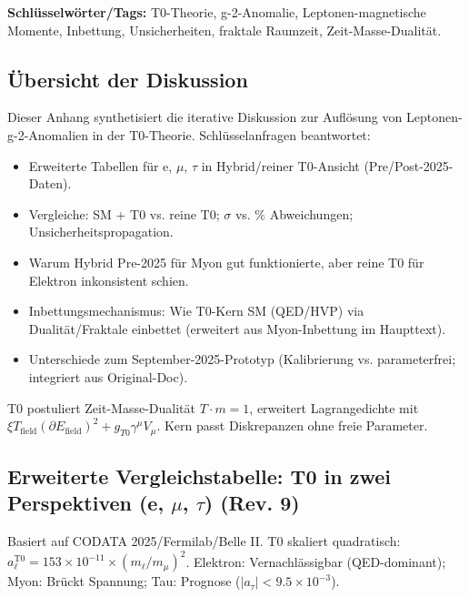 \documentclass[12pt,a4paper]{article}
\theoremstyle{definition}
\begin{document}
	\textbf{Schlüsselwörter/Tags:} T0-Theorie, g-2-Anomalie, Leptonen-magnetische Momente, Inbettung, Unsicherheiten, fraktale Raumzeit, Zeit-Masse-Dualität.
	
	\subsection{Übersicht der Diskussion}
	
	Dieser Anhang synthetisiert die iterative Diskussion zur Auflösung von Leptonen-g-2-Anomalien in der T0-Theorie. Schlüsselanfragen beantwortet:
	\begin{itemize}
		\item Erweiterte Tabellen für e, $\mu$, $\tau$ in Hybrid/reiner T0-Ansicht (Pre/Post-2025-Daten).
		\item Vergleiche: SM + T0 vs. reine T0; $\sigma$ vs. \% Abweichungen; Unsicherheitspropagation.
		\item Warum Hybrid Pre-2025 für Myon gut funktionierte, aber reine T0 für Elektron inkonsistent schien.
		\item Inbettungsmechanismus: Wie T0-Kern SM (QED/HVP) via Dualität/Fraktale einbettet (erweitert aus Myon-Inbettung im Haupttext).
		\item Unterschiede zum September-2025-Prototyp (Kalibrierung vs. parameterfrei; integriert aus Original-Doc).
	\end{itemize}
	
	T0 postuliert Zeit-Masse-Dualität $T \cdot m = 1$, erweitert Lagrangedichte mit $\xi T_\text{field} (\partial E_\text{field})^2 + g_{T0} \gamma^\mu V_\mu$. Kern passt Diskrepanzen ohne freie Parameter.
	
	\subsection{Erweiterte Vergleichstabelle: T0 in zwei Perspektiven (e, $\mu$, $\tau$) (Rev. 9)}
	
	Basiert auf CODATA 2025/Fermilab/Belle II. T0 skaliert quadratisch: $a_\ell^\text{T0} = 153 \times 10^{-11} \times (m_\ell / m_\mu)^2$. Elektron: Vernachlässigbar (QED-dominant); Myon: Brückt Spannung; Tau: Prognose ($|a_\tau| < 9.5 \times 10^{-3}$).
	
\end{document}
